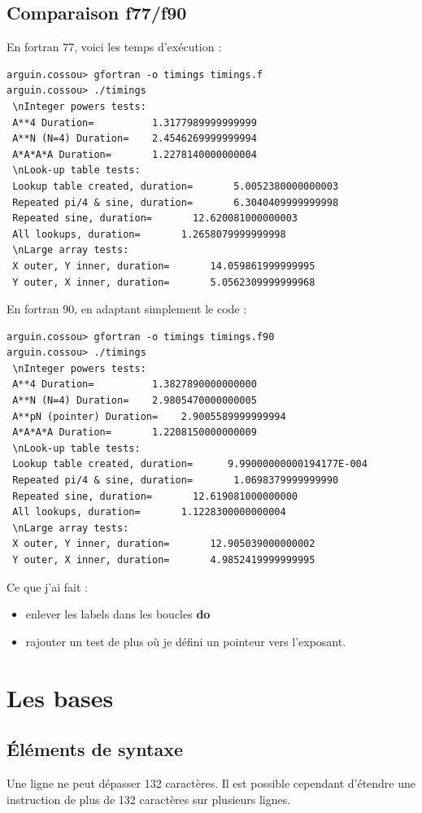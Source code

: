 \documentclass[a4paper,twoside]{article}
\begin{document}
\subsection{Comparaison f77/f90}
En fortran 77, voici les temps d'exécution : 
\begin{verbatim}
arguin.cossou> gfortran -o timings timings.f
arguin.cossou> ./timings 
 \nInteger powers tests:
 A**4 Duration=          1.3177989999999999     
 A**N (N=4) Duration=    2.4546269999999994     
 A*A*A*A Duration=       1.2278140000000004     
 \nLook-up table tests:
 Lookup table created, duration=       5.0052380000000003     
 Repeated pi/4 & sine, duration=       6.3040409999999998     
 Repeated sine, duration=       12.620081000000003     
 All lookups, duration=       1.2658079999999998     
 \nLarge array tests:
 X outer, Y inner, duration=       14.059861999999995     
 Y outer, X inner, duration=       5.0562309999999968   
\end{verbatim}

En fortran 90, en adaptant simplement le code :
\begin{verbatim}
arguin.cossou> gfortran -o timings timings.f90
arguin.cossou> ./timings 
 \nInteger powers tests:
 A**4 Duration=          1.3827890000000000     
 A**N (N=4) Duration=    2.9805470000000005     
 A**pN (pointer) Duration=    2.9005589999999994     
 A*A*A*A Duration=       1.2208150000000009     
 \nLook-up table tests:
 Lookup table created, duration=      9.99000000000194177E-004
 Repeated pi/4 & sine, duration=       1.0698379999999990     
 Repeated sine, duration=       12.619081000000000     
 All lookups, duration=       1.1228300000000004     
 \nLarge array tests:
 X outer, Y inner, duration=       12.905039000000002     
 Y outer, X inner, duration=       4.9852419999999995  
\end{verbatim}
Ce que j'ai fait : 
\begin{itemize}
\item enlever les labels dans les boucles \textbf{do}
\item rajouter un test de plus où je défini un pointeur vers l'exposant. 
\end{itemize}



\section{Les bases}
\subsection{Éléments de syntaxe}
Une ligne ne peut dépasser 132 caractères. Il est possible cependant d'étendre une instruction de plus de 132 caractères sur plusieurs lignes.
\end{document}
